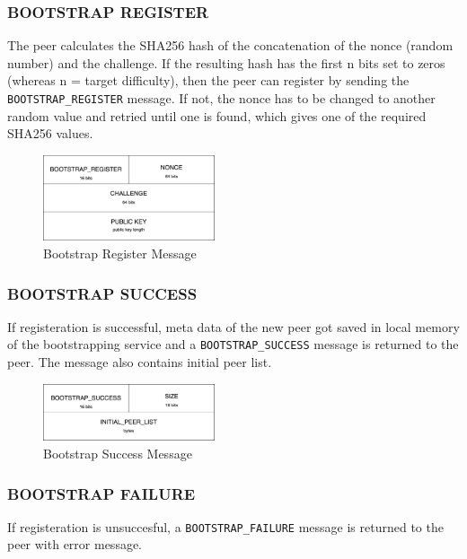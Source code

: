 \subsubsection{BOOTSTRAP REGISTER}

The peer calculates the SHA256 hash of the concatenation of the nonce (random number) and the challenge. If the resulting hash has the first n bits set to zeros (whereas n = target difficulty), then the peer can register by sending the \texttt{BOOTSTRAP\_REGISTER} message. If not, the nonce has to be changed to another random value and retried until one is found, which gives one of the required SHA256 values.

\begin{figure}[H]
    \centering
    \includegraphics[width=0.45\textwidth]{pics/bootstrap.register.png}
    \caption{Bootstrap Register Message}
\end{figure}

\subsubsection{BOOTSTRAP SUCCESS}

If registeration is successful, meta data of the new peer got saved in local memory of the bootstrapping service and a \texttt{BOOTSTRAP\_SUCCESS} message is returned to the peer. The message also contains initial peer list.

\begin{figure}[H]
    \centering
    \includegraphics[width=0.45\textwidth]{pics/bootstrap.success.png}
    \caption{Bootstrap Success Message}
\end{figure}

\subsubsection{BOOTSTRAP FAILURE}
If registeration is unsuccesful, a \texttt{BOOTSTRAP\_FAILURE} message is returned to the peer with error message. 

